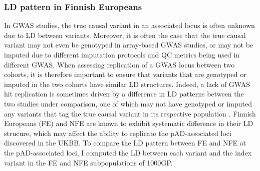\subsubsection{LD pattern in Finnish Europeans}
In GWAS studies, the true causal variant in an associated locus is often unknown due to LD between variants. Moreover, it is often the case that the true causal variant may not even be genotyped in array-based GWAS studies, or may not be imputed due to different imputation protocols and QC metrics being used in different GWAS. When assessing replication of a GWAS locus between two cohorts, it is therefore important to ensure that variants that are genotyped or imputed in the two cohorts have similar LD structures. Indeed, a lack of GWAS hit replication is sometimes driven by a difference in LD patterns between the two studies under comparison, one of which may not have genotyped or imputed any variants that tag the true causal variant in its respective population \cite{Kraft2009-xg}. Finnish Europeans (FE) and NFE are known to exhibit systematic difference in their LD strucure, which may affect the ability to replicate the pAD-associated loci discovered in the UKBB. To compare the LD pattern between FE and NFE at the pAD-associated loci, I computed the LD between each variant and the index variant in the FE and NFE subpopulations of 1000GP.\\





	

